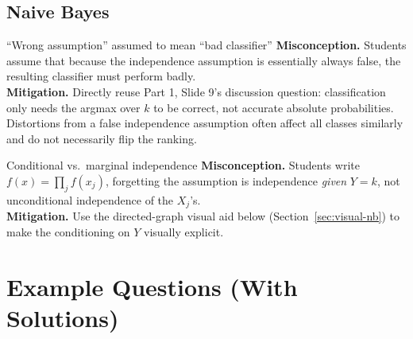 \documentclass[11pt]{article}
\begin{document}
\subsection{Naive Bayes}
\begin{diffconcept}{``Wrong assumption'' assumed to mean ``bad classifier''}
\textbf{Misconception.} Students assume that because the independence assumption is essentially always false, the resulting classifier must perform badly. \\
\textbf{Mitigation.} Directly reuse Part 1, Slide 9's discussion question: classification only needs the argmax over $k$ to be correct, not accurate absolute probabilities. Distortions from a false independence assumption often affect all classes similarly and do not necessarily flip the ranking.
\end{diffconcept}
\begin{diffconcept}{Conditional vs.\ marginal independence}
\textbf{Misconception.} Students write $f(x)=\prod_j f(x_j)$, forgetting the assumption is independence \emph{given} $Y=k$, not unconditional independence of the $X_j$'s. \\
\textbf{Mitigation.} Use the directed-graph visual aid below (Section~\ref{sec:visual-nb}) to make the conditioning on $Y$ visually explicit.
\end{diffconcept}

\section{Example Questions (With Solutions)}
\end{document}
